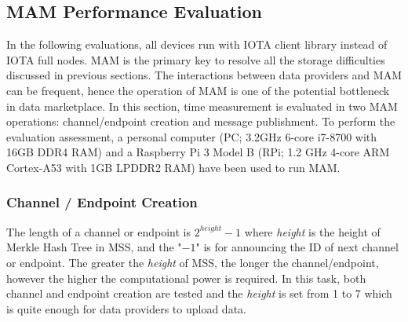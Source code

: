 \documentclass[conference]{IEEEtran}
\begin{document}
\subsection{MAM Performance Evaluation}
\label{section:mam_performance}
In the following evaluations, all devices run with IOTA client library instead of IOTA full nodes. MAM is the primary key to resolve all the storage difficulties discussed in previous sections. The interactions between data providers and MAM can be frequent, hence the operation of MAM is one of the potential bottleneck in data marketplace. In this section, time measurement is evaluated in two MAM operations: channel/endpoint creation and message publishment. To perform the evaluation assessment, a personal computer (PC; 3.2GHz 6-core i7-8700 with 16GB DDR4 RAM) and a Raspberry Pi 3 Model B (RPi; 1.2 GHz 4-core ARM Cortex-A53 with 1GB LPDDR2 RAM) have been used to run MAM.

\subsubsection{Channel / Endpoint Creation}
The length of a channel or endpoint is $2^{height}-1$ where \textit{height} is the height of Merkle Hash Tree in MSS, and the "$-1$" is for announcing the ID of next channel or endpoint. The greater the \textit{height} of MSS, the longer the channel/endpoint, however the higher the computational power is required. In this task, both channel and endpoint creation are tested and the \textit{height} is set from 1 to 7 which is quite enough for data providers to upload data.
\end{document}
